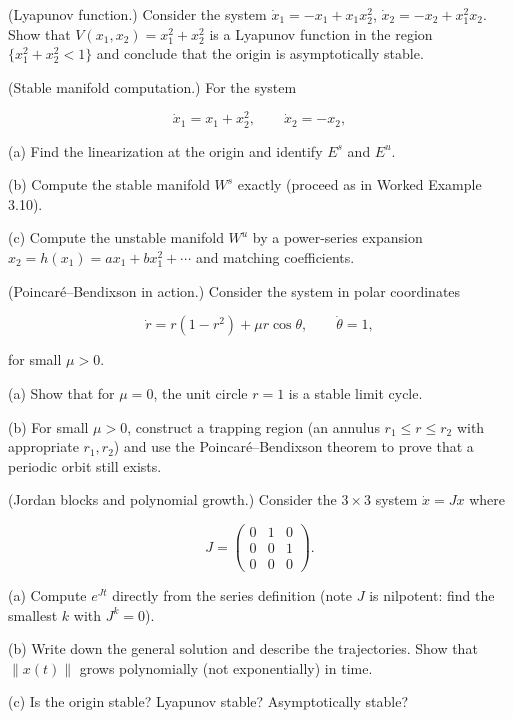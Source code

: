 \begin{exercise}
(Lyapunov function.) Consider the system $\dot{x}_1 = -x_1 + x_1 x_2^2$, $\dot{x}_2 = -x_2 + x_1^2 x_2$. Show that $V(x_1, x_2) = x_1^2 + x_2^2$ is a Lyapunov function in the region $\{x_1^2 + x_2^2 < 1\}$ and conclude that the origin is asymptotically stable.
\end{exercise}


\begin{exercise}
(Stable manifold computation.) For the system

\[
\dot{x}_1 = x_1 + x_2^2, \qquad \dot{x}_2 = -x_2,
\]

(a) Find the linearization at the origin and identify $E^s$ and $E^u$.

(b) Compute the stable manifold $W^s$ exactly (proceed as in Worked Example 3.10).

(c) Compute the unstable manifold $W^u$ by a power-series expansion $x_2 = h(x_1) = a x_1 + b x_1^2 + \cdots$ and matching coefficients.
\end{exercise}


\begin{exercise}
(Poincar\'e--Bendixson in action.) Consider the system in polar coordinates

\[
\dot{r} = r(1-r^2) + \mu r \cos\theta, \qquad \dot{\theta} = 1,
\]

for small $\mu > 0$.

(a) Show that for $\mu = 0$, the unit circle $r = 1$ is a stable limit cycle.

(b) For small $\mu > 0$, construct a trapping region (an annulus $r_1 \leq r \leq r_2$ with appropriate $r_1, r_2$) and use the Poincar\'e--Bendixson theorem to prove that a periodic orbit still exists.
\end{exercise}


\begin{exercise}
(Jordan blocks and polynomial growth.) Consider the $3 \times 3$ system $\dot{x} = Jx$ where

\[
J = \begin{pmatrix} 0 & 1 & 0 \\ 0 & 0 & 1 \\ 0 & 0 & 0 \end{pmatrix}.
\]

(a) Compute $e^{Jt}$ directly from the series definition (note $J$ is nilpotent: find the smallest $k$ with $J^k = 0$).

(b) Write down the general solution and describe the trajectories. Show that $\|x(t)\|$ grows polynomially (not exponentially) in time.

(c) Is the origin stable? Lyapunov stable? Asymptotically stable?
\end{exercise}


